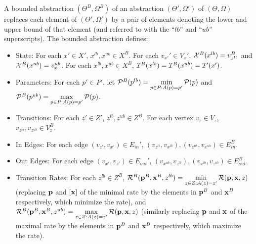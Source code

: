 \begin{definition}
A bounded abstraction $(\Theta^B, \Omega^B)$ of an abstraction $(\Theta',
\Omega')$ of $(\Theta, \Omega)$ replaces each element of $(\Theta',
\Omega')$ by a pair of elements denoting the lower and upper bound of that
element (and referred to with the ``$lb$'' and ``$ub$'' superscripts).  The
bounded abstraction defines:
\begin{itemize}
    \item State: For each $x' \in X'$,  $x^{lb}, x^{ub} \in X^B$.  For each
    $v_{x'}' \in V_x'$, ${\cal X}^B(x^{lb}) = v_{x^{lb}}^B$ and ${\cal X}^B(x^{ub}) =
    v_x^{ub}$.   For each $x^{lb}, x^{ub} \in X^B$, ${\cal I}^B(x^{lb}) = {\cal
    I}^B(x^{ub}) = {\cal I}'(x')$.
        \item Parameters: For each $p' \in P'$,
        let ${\cal P}^B(p^{lb}) = \min\limits_{p \in P: A(p) = p'} {\cal P}(p)$ and ${\cal P}^B(p^{ub}) = \max\limits_{p \in P: A(p) = p'} {\cal P}(p)$. 
        

        \item Transitions: For each $z' \in Z'$, $z^{lb}, z^{ub} \in Z^B$.
        For each vertex $v_z \in V_z$, $v_{z^{lb}}, v_{z^{ub}} \in V_z^B$.
        
        \item In Edges: For each edge $(v_{z'}, v_{x'}) \in E_{in}'$, $(v_{z^{lb}},
        v_{x^{lb}}), (v_{z^{ub}},
        v_{x^{ub}}) \in E^B_{in}$.
        \item Out Edges: For each edge $(v_{x'}, v_{z'}) \in E_{out}'$, $(v_{x^{ub}},
        v_{z^{lb}}), (v_{x^{lb}},
        v_{z^{ub}}) \in E^B_{out}$.

        
        \item Transition Rates: For each $z^{lb} \in Z^B$, ${\cal R}^B({\bf p}^B, {\bf
        x}^B, z^{lb}) = \min\limits_{z \in Z: A(z)=z'} {\cal R}({\bf p}, {\bf
        x}, z)$ (replacing ${\bf p}$ and $[\bf x]$ of the minimal rate by the 
        elements in ${\bf p}^B$ and ${\bf x}^B$ respectively, which minimize the
        rate), and ${\cal R}^B({\bf p}^B,
        {\bf
        x}^B, z^{ub}) = \max\limits_{z \in Z: A(z)=z'} {\cal R}({\bf p}, {\bf
        x}, z)$ (similarly replacing ${\bf p}$ and ${\bf x}$ of the maximal rate by the 
        elements in ${\bf p}^B$ and ${\bf x}^B$ respectively, which maximize the
        rate).
\end{itemize}
    
\end{definition}